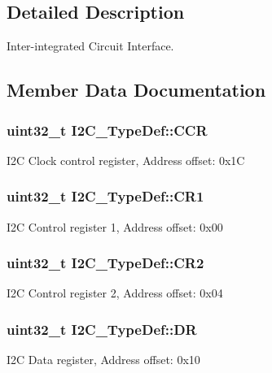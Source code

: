 \subsection{Detailed Description}
Inter-\/integrated Circuit Interface. 

\subsection{Member Data Documentation}
\subsubsection[{\texorpdfstring{C\+CR}{CCR}}]{ uint32\+\_\+t I2\+C\+\_\+\+Type\+Def\+::\+C\+CR}\hypertarget{struct_i2_c___type_def_a4d81b61d23a54d0d1e28646c3bb9aac5}{}\label{struct_i2_c___type_def_a4d81b61d23a54d0d1e28646c3bb9aac5}
I2C Clock control register, Address offset\+: 0x1C 
\subsubsection[{\texorpdfstring{C\+R1}{CR1}}]{ uint32\+\_\+t I2\+C\+\_\+\+Type\+Def\+::\+C\+R1}\hypertarget{struct_i2_c___type_def_a91782f7b81475b0e3c3779273abd26aa}{}\label{struct_i2_c___type_def_a91782f7b81475b0e3c3779273abd26aa}
I2C Control register 1, Address offset\+: 0x00 
\subsubsection[{\texorpdfstring{C\+R2}{CR2}}]{ uint32\+\_\+t I2\+C\+\_\+\+Type\+Def\+::\+C\+R2}\hypertarget{struct_i2_c___type_def_a29eb47db03d5ad7e9b399f8895f1768c}{}\label{struct_i2_c___type_def_a29eb47db03d5ad7e9b399f8895f1768c}
I2C Control register 2, Address offset\+: 0x04 
\subsubsection[{\texorpdfstring{DR}{DR}}]{ uint32\+\_\+t I2\+C\+\_\+\+Type\+Def\+::\+DR}\hypertarget{struct_i2_c___type_def_a5c1beaa4935359da1c8f0ceb287f90be}{}\label{struct_i2_c___type_def_a5c1beaa4935359da1c8f0ceb287f90be}
I2C Data register, Address offset\+: 0x10 
